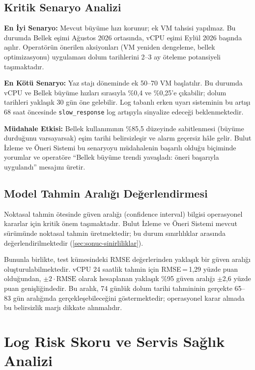 \subsection{Kritik Senaryo Analizi}

\textbf{En İyi Senaryo:} Mevcut büyüme hızı korunur; ek VM tahsisi yapılmaz.
Bu durumda Bellek eşimi Ağustos 2026 ortasında, vCPU eşimi Eylül 2026 başında aşılır.
Operatörün önerilen aksiyonları (VM yeniden dengeleme, bellek optimizasyonu) uygulaması dolum tarihlerini 2--3 ay öteleme potansiyeli taşımaktadır.

\textbf{En Kötü Senaryo:} Yaz stajı döneminde ek 50--70 VM başlatılır.
Bu durumda vCPU ve Bellek büyüme hızları sırasıyla \%0{,}4 ve \%0{,}25'e çıkabilir; dolum tarihleri yaklaşık 30 gün öne gelebilir.
Log tabanlı erken uyarı sisteminin bu artışı 68 saat öncesinde \texttt{slow\_response} log artışıyla sinyalize edeceği beklenmektedir.

\textbf{Müdahale Etkisi:} Bellek kullanımının \%85{,}5 düzeyinde sabitlenmesi (büyüme durduğunu varsayarsak) eşim tarihi belirsizleşir ve alarm geçersiz hâle gelir.
Bulut İzleme ve Öneri Sistemi bu senaryoyu müdahalenin başarılı olduğu biçiminde yorumlar ve operatöre ``Bellek büyüme trendi yavaşladı: öneri başarıyla uygulandı'' mesajını üretir.

\subsection{Model Tahmin Aralığı Değerlendirmesi}

Noktasal tahmin ötesinde güven aralığı (confidence interval) bilgisi operasyonel kararlar için kritik önem taşımaktadır.
Bulut İzleme ve Öneri Sistemi mevcut sürümünde noktasal tahmin üretmektedir; bu durum sınırlılıklar arasında değerlendirilmektedir (\autoref{sec:sonuc-sinirliliklar}).

Bununla birlikte, test kümesindeki RMSE değerlerinden yaklaşık bir güven aralığı oluşturulabilmektedir.
vCPU 24 saatlik tahmin için RMSE\,=\,1{,}29 yüzde puan olduğundan, $\pm 2 \cdot \text{RMSE}$ olarak hesaplanan yaklaşık \%95 güven aralığı $\pm$2{,}6 yüzde puan genişliğindedir.
Bu aralık, 74 günlük dolum tarihi tahmininin gerçekte 65--83 gün aralığında gerçekleşebileceğini göstermektedir; operasyonel karar almada bu belirsizlik marjı dikkate alınmalıdır.


\section{Log Risk Skoru ve Servis Sağlık Analizi}
\label{sec:logrisk}

